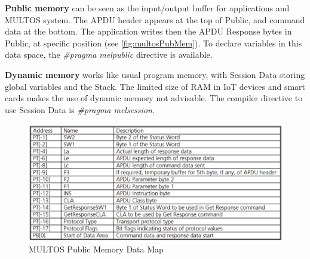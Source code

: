 \textbf{Public memory} can be seen as the input/output buffer for applications and MULTOS system. The APDU header appears at the top of Public, and command data at the bottom. The application writes then the APDU Response bytes in Public, at specific position (see \autoref{fig:multosPubMem}). To declare variables in this data space, the \textit{\#pragma melpublic} directive is available.

\textbf{Dynamic memory} works like usual program memory, with Session Data storing global variables and the Stack. The limited size of RAM in IoT devices and smart cards makes the use of dynamic memory not advisable. The compiler directive to use Session Data is \textit{\#pragma melsession}.


\begin{figure}[bth]
	\begin{center}
		\includegraphics[width=\linewidth]{gfx/multosPubMem}
	\end{center}
	\caption{MULTOS Public Memory Data Map}
	\label{fig:multosPubMem}
\end{figure}


\hfil


